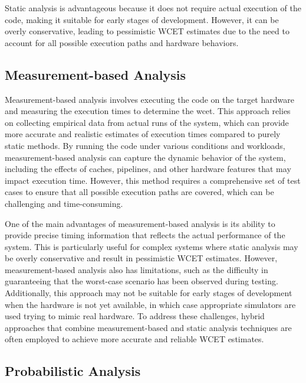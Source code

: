 
Static analysis is advantageous because it does not require actual execution of the code, making it suitable for early stages of development. However, it can be overly conservative, leading to pessimistic WCET estimates due to the need to account for all possible execution paths and hardware behaviors.

\subsection{Measurement-based Analysis}\label{sec:measurement_analysis}
Measurement-based analysis involves executing the code on the target hardware and measuring the execution times to determine the \ac{wcet}. 
This approach relies on collecting empirical data from actual runs of the system, which can provide more accurate and realistic estimates of execution times compared to purely static methods. 
By running the code under various conditions and workloads, measurement-based analysis can capture the dynamic behavior of the system, including the effects of caches, pipelines, and other hardware features that may impact execution time.
However, this method requires a comprehensive set of test cases to ensure that all possible execution paths are covered, which can be challenging and time-consuming\cite{wilhelmWorstcaseExecutiontimeProblem2008}.

One of the main advantages of measurement-based analysis is its ability to provide precise timing information that reflects the actual performance of the system. 
This is particularly useful for complex systems where static analysis may be overly conservative and result in pessimistic WCET estimates.
However, measurement-based analysis also has limitations, such as the difficulty in guaranteeing that the worst-case scenario has been observed during testing. 
Additionally, this approach may not be suitable for early stages of development when the hardware is not yet available, in which case appropriate simulators are used trying to mimic real hardware.\cite{wilhelmWorstcaseExecutiontimeProblem2008}
To address these challenges, hybrid approaches that combine measurement-based and static analysis techniques are often employed to achieve more accurate and reliable WCET estimates\cite{kelterWCETAnalysisOptimization}.

\subsection{Probabilistic Analysis}
\label{sec:probabilistic_analysis}

